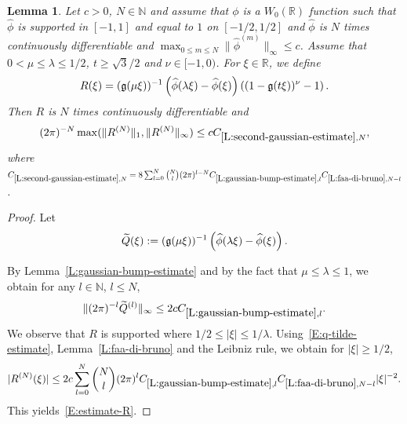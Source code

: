 \documentclass[12pt,reqno]{amsart}
\theoremstyle{plain}
\newtheorem{lemma}[theorem]{Lemma}
\numberwithin{equation}{section}
\theoremstyle{remark}
\newcommand{\uses}[1]{}
\newcommand{\usesdefs}[1]{}
\newcommand{\R}{{\mathbb R}}
\begin{document}
\begin{lemma}\label{L:second-gaussian-estimate}\uses{L:gaussian-bump-estimate,L:faa-di-bruno}\usesdefs{gaussian,auto:Wiener-space-definition}
Let $c>0$, $N\in \mathbb N$ and assume that $\phi$ is a $W_0(\R)$ function such that
$\widehat{\phi}$ is supported in $[-1,1]$ and equal to $1$ on $[-1/2,1/2]$ and $\widehat{\phi}$ is $N$ times continuously differentiable and $\max_{0\leq m \leq N} \|\widehat{\phi}^{(m)}\|_{\infty} \leq c$.
Assume that $0<\mu \leq \lambda \leq 1/2$, $t\geq \sqrt{3}/2$ and $\nu \in [-1,0)$. For $\xi \in \R$, we define
\begin{equation}\label{auto:second-Gaussian-multiplier}
R(\xi)=(\mathfrak{g}(\mu\xi))^{-1}\left(\widehat{\phi}(\lambda\xi)-\widehat{\phi}(\xi)\right)\left((1-\mathfrak{g}(t\xi))^{\nu} -1\right).
\end{equation}
Then $R$ is $N$ times continuously differentiable and
\begin{equation}\label{E:estimate-R}
(2\pi)^{-N} \max(\|R^{(N)}\|_1,\|R^{(N)}\|_\infty) \leq cC_{\ref{L:second-gaussian-estimate},N},
\end{equation}
where $C_{\ref{L:second-gaussian-estimate},N}=8\sum_{l=0}^N \binom{N}{l} (2\pi)^{l-N} C_{\ref{L:gaussian-bump-estimate},l} C_{\ref{L:faa-di-bruno},N-l}$.

\end{lemma}


\begin{proof}
Let
\[
\widetilde{Q}(\xi):=(\mathfrak{g}(\mu\xi))^{-1}\left(\widehat{\phi}(\lambda\xi)-\widehat{\phi}(\xi)\right).
\]


By Lemma~\ref{L:gaussian-bump-estimate} and by the fact that $\mu \leq \lambda \leq 1$, we obtain for any $l\in \mathbb N$, $l\leq N$,
\begin{equation}\label{E:q-tilde-estimate}
\|(2\pi)^{-l}\widetilde{Q}^{(l)}\|_{\infty} \leq 2c C_{\ref{L:gaussian-bump-estimate},l}.
\end{equation}
We observe that $R$ is supported where $1/2\le|\xi|\le1/\lambda$.
Using~\eqref{E:q-tilde-estimate}, Lemma~\ref{L:faa-di-bruno} and the Leibniz rule, we obtain for $|\xi|\geq 1/2$,
\[
|R^{(N)}(\xi)| \leq 2c\sum_{l=0}^N \binom{N}{l} (2\pi)^l C_{\ref{L:gaussian-bump-estimate},l} C_{\ref{L:faa-di-bruno},N-l} |\xi|^{-2}.
\]
This yields~\eqref{E:estimate-R}.
\end{proof}
\end{document}
